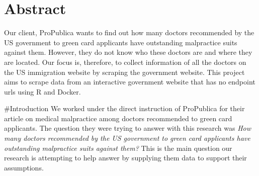 \documentclass[10pt,letterpaper]{article}
\newcommand{\getIndex}[2]{
  \ForEach{,}{\IfEq{#1}{\thislevelitem}{\number\thislevelcount\ExitForEach}{}}{#2}
}
\newcommand{\getAff}[1]{
  \getIndex{#1}{}
}
\begin{document}
\vspace*{0.2in}

\section*{Abstract}
Our client, ProPublica wants to find out how many doctors recommended by
the US government to green card applicants have outstanding malpractice
suits against them. However, they do not know who these doctors are and
where they are located. Our focus is, therefore, to collect information
of all the doctors on the US immigration website by scraping the
government website. This project aims to scrape data from an interactive
government website that has no endpoint urls using R and Docker.


\linenumbers

\#Introduction We worked under the direct instruction of ProPublica for
their article on medical malpractice among doctors recommended to green
card applicants. The question they were trying to answer with this
research was \emph{How many doctors recommended by the US government to
green card applicants have outstanding malpractice suits against them?}
This is the main question our research is attempting to help answer by
supplying them data to support their assumptions.
\end{document}
